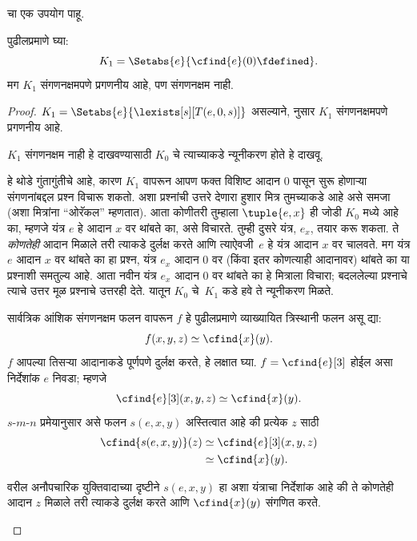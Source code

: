 \documentclass[../../../include/open-logic-section]{subfiles}
\begin{document}

 चा एक उपयोग पाहू.

\begin{prop}
पुढीलप्रमाणे घ्या:
\[
K_1 = \Setabs{e}{\cfind{e}(0) \fdefined}.
\]
मग $K_1$ संगणनक्षमपणे प्रगणनीय आहे, पण संगणनक्षम नाही.
\end{prop}

\begin{proof}
$K_1 = \Setabs{e}{\lexists[s][T(e,0,s)]}$ असल्याने,
 नुसार $K_1$ संगणनक्षमपणे
प्रगणनीय आहे.

$K_1$ संगणनक्षम नाही हे दाखवण्यासाठी $K_0$ चे
त्याच्याकडे न्यूनीकरण होते हे दाखवू.

\begin{explain}
हे थोडे गुंतागुंतीचे आहे, कारण $K_1$ वापरून आपण फक्त
विशिष्ट आदान $0$ पासून सुरू होणाऱ्या संगणनांबद्दल प्रश्न
विचारू शकतो. अशा प्रश्नांची उत्तरे देणारा हुशार मित्र
तुमच्याकडे आहे असे समजा (अशा मित्रांना ``ओरॅकल'' म्हणतात).
आता कोणीतरी तुम्हाला $\tuple{e,
  x}$ ही जोडी $K_0$ मध्ये आहे का, म्हणजे यंत्र $e$ हे
आदान $x$ वर थांबते का, असे विचारते. तुम्ही दुसरे यंत्र,
$e_x$, तयार करू शकता. ते \emph{कोणतेही} आदान मिळाले तरी
त्याकडे दुर्लक्ष करते आणि त्याऐवजी~$e$ हे यंत्र आदान
$x$ वर चालवते. मग यंत्र $e$ आदान $x$ वर थांबते का हा
प्रश्न, यंत्र $e_x$ आदान $0$ वर (किंवा इतर कोणत्याही
आदानावर) थांबते का या प्रश्नाशी समतुल्य आहे. आता नवीन
यंत्र $e_x$ आदान $0$ वर थांबते का हे मित्राला विचारा;
बदललेल्या प्रश्नाचे त्याचे उत्तर मूळ प्रश्नाचे उत्तरही देते.
यातून $K_0$ चे~$K_1$ कडे हवे ते न्यूनीकरण मिळते.
\end{explain}

सार्वत्रिक आंशिक संगणनक्षम फलन वापरून $f$ हे पुढीलप्रमाणे
व्याख्यायित त्रिस्थानी फलन असू द्या:
\[
f(x,y,z) \simeq \cfind{x}(y).
\]
$f$ आपल्या तिसऱ्या आदानाकडे पूर्णपणे दुर्लक्ष करते, हे
लक्षात घ्या. $f = \cfind{e}[3]$ होईल असा निर्देशांक $e$
निवडा; म्हणजे
\[
\cfind{e}[3](x,y,z) \simeq \cfind{x}(y).
\]
$s$-$m$-$n$ प्रमेयानुसार असे फलन $s(e,x,y)$ अस्तित्वात
आहे की प्रत्येक $z$ साठी
\begin{align*}
\cfind{s(e,x,y)}(z) & \simeq \cfind{e}[3](x,y,z) \\
& \simeq \cfind{x}(y).
\end{align*}

\begin{explain}
वरील अनौपचारिक युक्तिवादाच्या दृष्टीने $s(e,x,y)$ हा
अशा यंत्राचा निर्देशांक आहे की ते कोणतेही आदान $z$
मिळाले तरी त्याकडे दुर्लक्ष करते आणि $\cfind{x}(y)$
संगणित करते.
\end{explain}


\end{proof}
\end{document}
